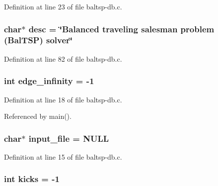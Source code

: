 Definition at line 23 of file baltsp-db.c.\hypertarget{bin_2baltsp-db_8c_3aad16fd4bea1b9717f232ea75ad6449}{
\subsubsection[{desc}]{\setlength{\rightskip}{0pt plus 5cm}char$\ast$ {\bf desc} = \char`\"{}Balanced traveling salesman problem (BalTSP) solver\char`\"{}}}
\label{bin_2baltsp-db_8c_3aad16fd4bea1b9717f232ea75ad6449}




Definition at line 82 of file baltsp-db.c.\hypertarget{bin_2baltsp-db_8c_61a12d5995172f376610cce2f19e5855}{
\subsubsection[{edge\_\-infinity}]{\setlength{\rightskip}{0pt plus 5cm}int {\bf edge\_\-infinity} = -1}}
\label{bin_2baltsp-db_8c_61a12d5995172f376610cce2f19e5855}




Definition at line 18 of file baltsp-db.c.

Referenced by main().\hypertarget{bin_2baltsp-db_8c_a4f3a15de34c409bdec6ceacf93078ed}{
\subsubsection[{input\_\-file}]{\setlength{\rightskip}{0pt plus 5cm}char$\ast$ {\bf input\_\-file} = NULL}}
\label{bin_2baltsp-db_8c_a4f3a15de34c409bdec6ceacf93078ed}




Definition at line 15 of file baltsp-db.c.\hypertarget{bin_2baltsp-db_8c_b8f057ba1ad6b7f0c46f8140b25b3467}{
\subsubsection[{kicks}]{\setlength{\rightskip}{0pt plus 5cm}int {\bf kicks} = -1}}
\label{bin_2baltsp-db_8c_b8f057ba1ad6b7f0c46f8140b25b3467}





